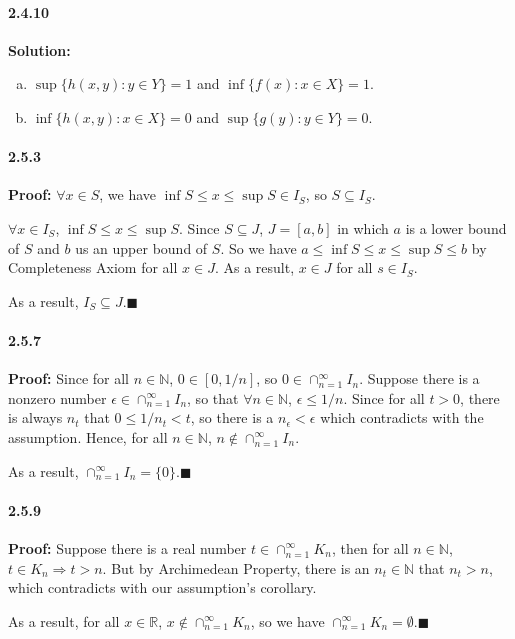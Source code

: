 \documentclass[11pt]{article}
\begin{document}
	\paragraph{2.4.10}\textbf{Solution:}
		\begin{enumerate}[(a)]
			\item $\sup \{h(x,y): y \in Y\} = 1$ and $\inf\{f(x) : x \in X\} = 1$.
			\item $\inf \{h(x,y): x \in X\} = 0$ and $\sup\{g(y): y \in Y\} = 0$.
		\end{enumerate}
	\paragraph{2.5.3}\textbf{Proof:}
		$\forall x \in S$, we have $\inf S \leq x \leq \sup S \in I_S$, so $S \subseteq I_S$.
		
		$\forall x \in I_S$, $\inf S \leq x \leq \sup S$. Since $S \subseteq J$, $J = [a, b]$ in which $a$ is a lower bound of $S$ and $b$ us an upper bound of $S$. So we have $a \leq \inf S \leq x \leq \sup S \leq b$ by Completeness Axiom for all $x \in J$. As a result, $x \in J$ for all $s \in I_S$.
		
		As a result, $I_S \subseteq J$.$\blacksquare$ 
	\paragraph{2.5.7}\textbf{Proof:} Since for all $n \in \mathbb{N}$, $0 \in [0, 1/n]$, so $0 \in \cap_{n = 1}^{\infty}I_n$. Suppose there is a nonzero number $\epsilon \in \cap_{n = 1}^{\infty}I_n$, so that $\forall n \in \mathbb{N}$, $\epsilon \leq 1/n$. Since for all $t > 0$, there is always $n_t$ that $0 \leq 1/n_t < t$, so there is a $n_{\epsilon} < \epsilon$ which contradicts with the assumption. Hence, for all $n \in \mathbb{N}$, $n \notin \cap_{n = 1}^{\infty}I_n$.
	
	As a result, $\cap_{n = 1}^{\infty}I_n = \{0\}$.$\blacksquare$
	\paragraph{2.5.9}\textbf{Proof:}
		Suppose there is a real number $t \in \cap_{n = 1}^{\infty}K_n$, then 
		for all $n \in \mathbb{N}$, $t \in K_n \Rightarrow t > n$. But by Archimedean Property, there is an $n_t \in \mathbb{N}$ that $n_t > n$, which contradicts with our assumption's corollary.
		
		As a result, for all $x \in \mathbb{R}$, $x \notin \cap_{n = 1}^{\infty}K_n$, so we have $\cap_{n = 1}^{\infty}K_n = \emptyset$.$\blacksquare$
	
\end{document}
